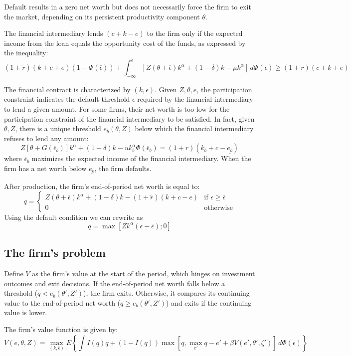 \documentclass[12pt]{article}
\begin{document}
Default results in a zero net worth but does not necessarily force the firm to exit the market, depending on its
persistent productivity component $\theta$.

The financial intermediary lends $(c + k - e)$ to the firm only if the expected income from the loan equals the
opportunity cost of the funds, as expressed by the inequality:
\[
(1+\widetilde{r} )(k+c+e)(1-\Phi(\overline{\epsilon}))+\int_{-\infty}^{\overline{\epsilon}}[Z(\theta+\overline{\epsilon})
k^\alpha+(1-\delta)k-\mu k^\alpha] \,d\Phi(\epsilon) \geq (1+r)(c+k+e)
\]

The financial contract is characterized by $(k,\overline{\epsilon})$. Given $Z,\theta,e$, the participation constraint
indicates the default threshold $\overline{\epsilon}$ required by the financial intermediary to lend a given amount. For
some firms, their net worth is too low for the participation constraint of the financial intermediary to be satisfied.
In fact, given $\theta, Z$, there is a unique threshold $e_b(\theta,Z)$ below which the financial intermediary
refuses to lend any amount:
\[
Z[\theta+G(\overline{\epsilon}_b )]k^\alpha+(1-\delta)k-uk_b^\alpha\Phi (\overline{\epsilon}_b)=(1+r)(k_b+c-\underline{e_b})
\]
where $\overline{\epsilon}_b$ maximizes the expected income of the financial intermediary. When the firm has a net worth
below $\underline{e_b}$, the firm defaults.

After production, the firm's end-of-period net worth is equal to:
\[
q = \begin{cases}
  Z(\theta+\overline{\epsilon})k^\alpha +(1-\delta)k-(1+\widetilde{r})(k+c-e) & \text{if } \epsilon\geq \overline{\epsilon} \\
  0 & \text{otherwise}
\end{cases}
\]
Using the default condition we can rewrite as 
\[q = \max[Zk^\alpha(\epsilon-\overline{\epsilon});0]\]

\subsection{The firm's problem}
Define $V$ as the firm's value at the start of the period, which hinges on investment outcomes and exit decisions. If
the end-of-period net worth falls below a threshold ($q < e_b(\theta', Z')$), the firm exits. Otherwise, it compares its
continuing value to the end-of-period net worth ($q \geq e_b(\theta', Z')$) and exits if the continuing value is lower.

The firm's value function is given by:
\[
V(e,\theta,Z) = \max_{(k,\overline{\epsilon})}E\left\{\int I(q)q + (1-I(q))\max[q,\max_{e'}q-e'+\beta V(e',\theta',
\zeta')]\,d\Phi(\epsilon)\right\}
\]
\end{document}
